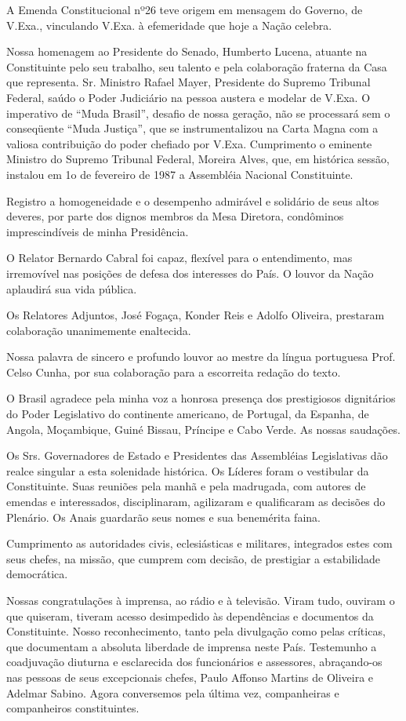 A Emenda Constitucional nº26 teve origem em mensagem do Governo, de
V.Exa., vinculando V.Exa. à efemeridade que hoje a Nação celebra.

Nossa homenagem ao Presidente do Senado, Humberto Lucena, atuante na
Constituinte pelo seu trabalho, seu talento e pela colaboração fraterna
da Casa que representa. Sr. Ministro Rafael Mayer, Presidente do Supremo
Tribunal Federal, saúdo o Poder Judiciário na pessoa austera e modelar
de V.Exa. O imperativo de ``Muda Brasil'', desafio de nossa geração, não
se processará sem o conseqüente ``Muda Justiça'', que se
instrumentalizou na Carta Magna com a valiosa contribuição do poder
chefiado por V.Exa. Cumprimento o eminente Ministro do Supremo Tribunal
Federal, Moreira Alves, que, em histórica sessão, instalou em 1o de
fevereiro de 1987 a Assembléia Nacional Constituinte.

Registro a homogeneidade e o desempenho admirável e solidário de seus
altos deveres, por parte dos dignos membros da Mesa Diretora, condôminos
imprescindíveis de minha Presidência.

O Relator Bernardo Cabral foi capaz, flexível para o entendimento, mas
irremovível nas posições de defesa dos interesses do País. O louvor da
Nação aplaudirá sua vida pública.

Os Relatores Adjuntos, José Fogaça, Konder Reis e Adolfo Oliveira,
prestaram colaboração unanimemente enaltecida.

Nossa palavra de sincero e profundo louvor ao mestre da língua
portuguesa Prof. Celso Cunha, por sua colaboração para a escorreita
redação do texto.

O Brasil agradece pela minha voz a honrosa presença dos prestigiosos
dignitários do Poder Legislativo do continente americano, de Portugal,
da Espanha, de Angola, Moçambique, Guiné Bissau, Príncipe e Cabo Verde.
As nossas saudações.

Os Srs. Governadores de Estado e Presidentes das Assembléias
Legislativas dão realce singular a esta solenidade histórica. Os Líderes
foram o vestibular da Constituinte. Suas reuniões pela manhã e pela
madrugada, com autores de emendas e interessados, disciplinaram,
agilizaram e qualificaram as decisões do Plenário. Os Anais guardarão
seus nomes e sua benemérita faina.

Cumprimento as autoridades civis, eclesiásticas e militares, integrados
estes com seus chefes, na missão, que cumprem com decisão, de prestigiar
a estabilidade democrática.

Nossas congratulações à imprensa, ao rádio e à televisão. Viram tudo,
ouviram o que quiseram, tiveram acesso desimpedido às dependências e
documentos da Constituinte. Nosso reconhecimento, tanto pela divulgação
como pelas críticas, que documentam a absoluta liberdade de imprensa
neste País. Testemunho a coadjuvação diuturna e esclarecida dos
funcionários e assessores, abraçando-os nas pessoas de seus excepcionais
chefes, Paulo Affonso Martins de Oliveira e Adelmar Sabino. Agora
conversemos pela última vez, companheiras e companheiros constituintes.


